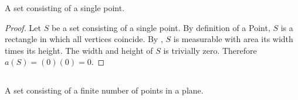 \documentclass{report}
\begin{document}
A set consisting of a single point.

\begin{proof}

  Let $S$ be a set consisting of a single point.
  By definition of a Point, $S$ is a rectangle in which all vertices coincide.
  By , $S$ is measurable with area its width times
    its height.
  The width and height of $S$ is trivially zero.
  Therefore $a(S) = (0)(0) = 0$.

\end{proof}

\subsection{}%
\label{sub:exercise-1.7.1b}

A set consisting of a finite number of points in a plane.
\end{document}
